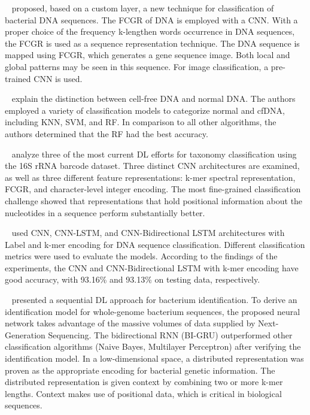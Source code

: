 \citeauthor{Abd-Alhalem2020BacterialLayers}~\cite{Abd-Alhalem2020BacterialLayers} proposed, based on a custom layer, a new technique for classification of bacterial \gls{DNA} sequences. The \gls{FCGR} of \gls{DNA} is employed with a \gls{CNN}. With a proper choice of the frequency k-lengthen words occurrence in \gls{DNA} sequences, the \gls{FCGR} is used as a sequence representation technique. The \gls{DNA} sequence is mapped using \gls{FCGR}, which generates a gene sequence image. Both local and global patterns may be seen in this sequence. For image classification, a pre-trained \gls{CNN} is used. 

\citeauthor{Chen2017AClassification}~\cite{Chen2017AClassification} explain the distinction between cell-free DNA and normal DNA. The authors employed a variety of classification models to categorize normal and cfDNA, including \gls{KNN}, \gls{SVM}, and \gls{RF}. In comparison to all other algorithms, the authors determined that the \gls{RF} had the best accuracy. %

\citeauthor{Helaly2019ConvolutionalStudy}~\cite{Helaly2019ConvolutionalStudy} analyze three of the most current \gls{DL} efforts for taxonomy classification using the 16S rRNA barcode dataset. Three distinct \gls{CNN} architectures are examined, as well as three different feature representations: k-mer spectral representation, \gls{FCGR}, and character-level integer encoding. The most fine-grained classification challenge showed that representations that hold positional information about the nucleotides in a sequence perform substantially better.

\citeauthor{Gunasekaran2021AnalysisModels}~\cite{Gunasekaran2021AnalysisModels} used \gls{CNN}, \gls{CNN}-\gls{LSTM}, and \gls{CNN}-Bidirectional \gls{LSTM} architectures with Label and k-mer encoding for \gls{DNA} sequence classification. Different classification metrics were used to evaluate the models. According to the findings of the experiments, the \gls{CNN} and \gls{CNN}-Bidirectional \gls{LSTM} with k-mer encoding have good accuracy, with 93.16\% and 93.13\% on testing data, respectively.

\citeauthor{Lugo2021AIdentification}~\cite{Lugo2021AIdentification} presented a sequential \gls{DL} approach for bacterium identification. To derive an identification model for whole-genome bacterium sequences, the proposed neural network takes advantage of the massive volumes of data supplied by Next-Generation Sequencing. The bidirectional \gls{RNN} (BI-\gls{GRU}) outperformed other classification algorithms (Naive Bayes, Multilayer Perceptron) after verifying the identification model. In a low-dimensional space, a distributed representation was proven as the appropriate encoding for bacterial genetic information. The distributed representation is given context by combining two or more k-mer lengths. Context makes use of positional data, which is critical in biological sequences.

